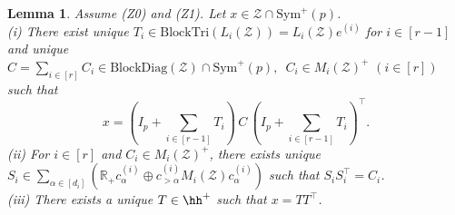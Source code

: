 \documentclass[12pt]{amsart}
\theoremstyle{plain}
\newtheorem{lemma}[theorem]{Lemma}
\theoremstyle{definition}
\theoremstyle{remark}
\newcommand{\R}{\mathbb{R}}
\newcommand{\1}{\mathbf{1}}
\newcommand{\mytransp}[1]{ #1^{\top}}
\newcommand{\bdiag}{\mathrm{BlockDiag}}
\newcommand{\tri}{\mathrm{BlockTri}}
\begin{document}
\begin{lemma}\label{lem:gen_Cholesky0} 
Assume (Z0) and (Z1).  
Let $x \in \mathcal{Z} \cap \mathrm{Sym}^+(p)$.\\
{\rm (i)} 
There exist 
 unique $T_i \in \tri(L_i(\mathcal{Z})) = L_i(\mathcal{Z}) e^{(i)}$  for $i \in [r-1]$ 
 and 
 unique $C =\sum_{i\in [r]} C_i \in \bdiag(\mathcal{Z}) \cap \mathrm{Sym}^+(p),\,\,\,
 C_i \in M_i(\mathcal{Z})^+\,\, (i\in [r])$
 such that
 \begin{equation} \label{eqn:TiC}
 x = (I_p+ \sum_{i\in[r-1]} T_i) \,C\, \mytransp{ (I_p + \sum_{i\in[r-1]} T_i)}.
 \end{equation}
{\rm (ii)} 
For $i \in [r]$ and $C_i \in M_i(\mathcal{Z})^+$,
 there exists unique
 $S_i \in \sum_{\alpha\in[d_i]} (\R_+ c^{(i)}_\alpha \oplus c^{(i)}_{>\alpha} M_i(\mathcal{Z}) c^{(i)}_\alpha )$ 
 such that $S_i \mytransp{S_i} = C_i$.\\
{\rm (iii)}
There exists a unique $T \in \hh^+$ such that $x = T \mytransp{T}$.
\end{lemma}
\end{document}
